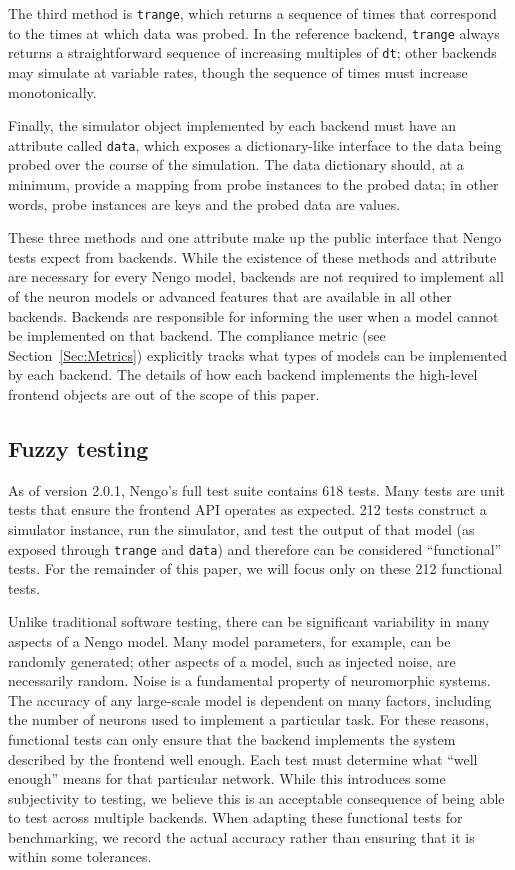 \documentclass{frontiersSCNS}
\begin{document}
The third method is \texttt{trange},
which returns a sequence of times that correspond
to the times at which data was probed.
In the reference backend, \texttt{trange} always returns
a straightforward sequence of increasing
multiples of \texttt{dt};
other backends may simulate at variable rates,
though the sequence of times must increase monotonically.

Finally, the simulator object implemented by each backend
must have an attribute called \texttt{data},
which exposes a dictionary-like interface
to the data being probed over the course
of the simulation.
The data dictionary should,
at a minimum, provide a mapping from
probe instances to the probed data;
in other words, probe instances are keys
and the probed data are values.

These three methods and one attribute
make up the public interface
that Nengo tests expect from backends.
While the existence of these methods
and attribute are necessary
for every Nengo model,
backends are not required
to implement all of the neuron models
or advanced features that
are available in all other backends.
Backends are responsible for informing
the user when a model cannot be implemented
on that backend.
The compliance metric (see Section~\ref{Sec:Metrics})
explicitly tracks what
types of models can be implemented
by each backend.
The details of how each backend
implements the high-level frontend objects
are out of the scope of this paper.

\subsection{Fuzzy testing}

As of version 2.0.1, Nengo's full test suite contains 618 tests.
Many tests are unit tests
that ensure the frontend API operates as expected.
212 tests construct a simulator instance,
run the simulator, and test the output of that model
(as exposed through \texttt{trange}
and \texttt{data})
and therefore can be considered ``functional'' tests.
For the remainder of this paper,
we will focus only on these 212 functional tests.

Unlike traditional software testing,
there can be significant variability
in many aspects of a Nengo model.
Many model parameters, for example,
can be randomly generated;
other aspects of a model,
such as injected noise,
are necessarily random.
Noise is a fundamental property
of neuromorphic systems.
The accuracy of any large-scale model
is dependent on many factors,
including the number of neurons used
to implement a particular task.
For these reasons,
functional tests can only
ensure that the backend implements
the system described by the frontend
well enough.
Each test must determine what
``well enough'' means for that particular network.
While this introduces some subjectivity
to testing,
we believe this is an acceptable consequence
of being able to test across multiple backends.
When adapting these functional tests for benchmarking,
we record the actual accuracy rather than
ensuring that it is within some tolerances.
\end{document}
